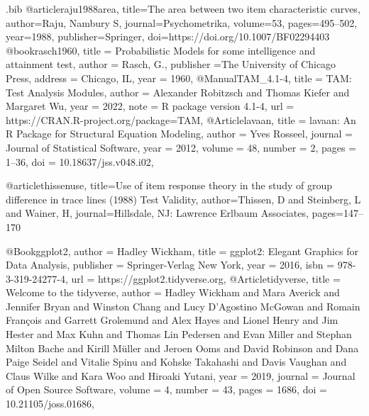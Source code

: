 \begin{filecontents*}{\jobname.bib}
  @article{raju1988area,
  title={The area between two item characteristic curves},
  author={Raju, Nambury S},
  journal={Psychometrika},
  volume={53},
  pages={495--502},
  year={1988},
  publisher={Springer},
  doi={https://doi.org/10.1007/BF02294403}
}
@book{rasch1960,
  title = {Probabilistic Models for some intelligence and attainment test},
  author = {Rasch, G.},
   publisher ={The University of Chicago Press},
  address = {Chicago, IL},
  year = {1960},
}
@Manual{TAM_4.1-4,
    title = {TAM: Test Analysis Modules},
    author = {Alexander Robitzsch and Thomas Kiefer and Margaret Wu},
    year = {2022},
    note = {R package version 4.1-4},
    url = {https://CRAN.R-project.org/package=TAM},
  }
@Article{lavaan,
    title = {{lavaan}: An {R} Package for Structural Equation Modeling},
    author = {Yves Rosseel},
    journal = {Journal of Statistical Software},
    year = {2012},
    volume = {48},
    number = {2},
    pages = {1--36},
    doi = {10.18637/jss.v048.i02},
  }

@article{thissenuse,
  title={Use of item response theory in the study of group difference in trace lines (1988) Test Validity},
  author={Thissen, D and Steinberg, L and Wainer, H},
  journal={Hillsdale, NJ: Lawrence Erlbaum Associates},
  pages={147--170}
}

@Book{ggplot2,
    author = {Hadley Wickham},
    title = {ggplot2: Elegant Graphics for Data Analysis},
    publisher = {Springer-Verlag New York},
    year = {2016},
    isbn = {978-3-319-24277-4},
    url = {https://ggplot2.tidyverse.org},
  }
@Article{tidyverse,
    title = {Welcome to the {tidyverse}},
    author = {Hadley Wickham and Mara Averick and Jennifer Bryan and Winston Chang and Lucy D'Agostino McGowan and Romain François and Garrett Grolemund and Alex Hayes and Lionel Henry and Jim Hester and Max Kuhn and Thomas Lin Pedersen and Evan Miller and Stephan Milton Bache and Kirill Müller and Jeroen Ooms and David Robinson and Dana Paige Seidel and Vitalie Spinu and Kohske Takahashi and Davis Vaughan and Claus Wilke and Kara Woo and Hiroaki Yutani},
    year = {2019},
    journal = {Journal of Open Source Software},
    volume = {4},
    number = {43},
    pages = {1686},
    doi = {10.21105/joss.01686},
  }
\end{filecontents*}


\documentclass[10pt,a4paper]{article}




\nocite{*} %



